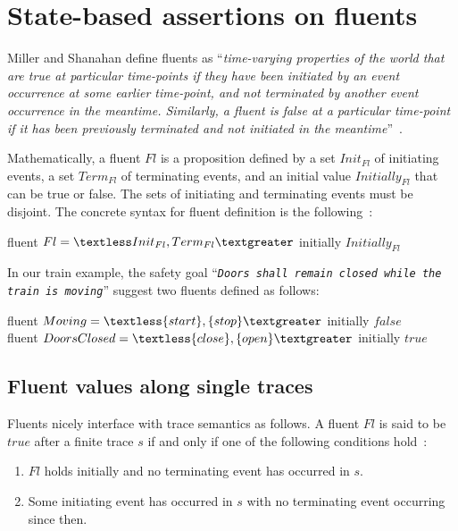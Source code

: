 \section{State-based assertions on fluents\label{section:background-fluents}}

Miller and Shanahan define fluents as ``\emph{time-varying properties of the world that are true at particular time-points if they have been initiated by an event occurrence at some earlier time-point, and not terminated by another event occurrence in the meantime. Similarly, a fluent is false at a particular time-point if it has been previously terminated and not initiated in the meantime}''~\cite{Miller:2002}.

Mathematically, a fluent $Fl$ is a proposition defined by a set $Init_{Fl}$ of initiating events, a set $Term_{Fl}$ of terminating events, and an initial value $Initially_{Fl}$ that can be true or false. The sets of initiating and terminating events must be disjoint. The concrete syntax for fluent definition is the following~\cite{Giannakopoulou:2003}:

\begin{center}
fluent $Fl = \textless Init_{Fl}, Term_{Fl} \textgreater $ initially $Initially_{Fl}$
\end{center}

In our train example, the safety goal ``\emph{\texttt{Doors shall remain closed while the train is moving}}'' suggest two fluents defined as follows:

\begin{center}
fluent $Moving = \textless \{start\}, \{stop\} \textgreater $ initially $false$ \\
fluent $DoorsClosed = \textless \{close\}, \{open\} \textgreater $ initially $true$ \\
\end{center}

\subsection{Fluent values along single traces}

Fluents nicely interface with trace semantics as follows. A fluent $Fl$ is said to be $true$ after a finite trace $s$ if and only if one of the following conditions hold~\cite{Giannakopoulou:2003}:

\begin{enumerate}
\item $Fl$ holds initially and no terminating event has occurred in $s$.
\item Some initiating event has occurred in $s$ with no terminating event occurring since then.
\end{enumerate}

